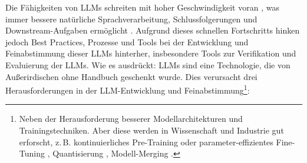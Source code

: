 \documentclass[twocolumn]{article}
\begin{document}
Die Fähigkeiten von LLMs schreiten mit hoher Geschwindigkeit voran \cite{Minaee24}, was immer bessere natürliche Sprachverarbeitung, Schlussfolgerungen und Downstream-Aufgaben ermöglicht \cite{Kaplan20}. Aufgrund dieses schnellen Fortschritts hinken jedoch Best Practices, Prozesse und Tools bei der Entwicklung und Feinabstimmung dieser LLMs hinterher, insbesondere Tools zur Verifikation und Evaluierung der LLMs. Wie \cite{Gra23} es ausdrückt: LLMs sind eine Technologie, die von Außerirdischen ohne Handbuch geschenkt wurde. Dies verursacht drei Herausforderungen in der LLM-Entwicklung und Feinabstimmung\footnote{Neben der Herausforderung besserer Modellarchitekturen und Trainingstechniken. Aber diese werden in Wissenschaft und Industrie gut erforscht, z.\,B. kontinuierliches Pre-Training \cite{Ke23} oder parameter-effizientes Fine-Tuning \cite{Liu22}, Quantisierung \cite{Dettmers22}, Modell-Merging \cite{Akiba24}.}:
\end{document}
